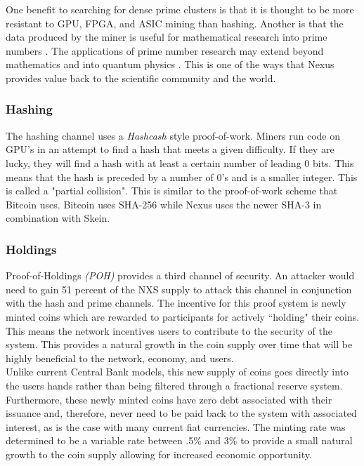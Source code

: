 \documentclass[11pt]{article}
\begin{document}
\noindent One benefit to searching for dense prime clusters is that it is thought to be more resistant to GPU, FPGA, and ASIC mining than hashing.
Another is that the data produced by the miner is useful for mathematical research into prime numbers \cite{findingprimeclusterspaper} \cite{nxsprimecom}.
The applications of prime number research may extend beyond mathematics and into quantum physics \cite{physicsmathprime}.
This is one of the ways that Nexus provides value back to the scientific community and the world.

\subsubsection{Hashing}

The hashing channel uses a \textit{Hashcash} \cite{hashcash} style proof-of-work.
Miners run code \cite{skminer,wolfniro} on GPU's in an attempt to find a hash that meets a given difficulty.
If they are lucky, they will find a hash with at least a certain number of leading 0 bits. 
This means that the hash is preceded by a number of 0's and is a smaller integer. 
This is called a "partial collision".
This is similar to the proof-of-work scheme that Bitcoin uses.
Bitcoin uses SHA-256 while Nexus uses the newer SHA-3 in combination with Skein.

\subsubsection{Holdings}

Proof-of-Holdings \textit{(POH)} provides a third channel of security.
An attacker would need to gain 51 percent of the NXS supply to attack this channel in conjunction with the hash and prime channels.
The incentive for this proof system is newly minted coins which are rewarded to participants for actively ``holding" their coins. 
This means the network incentives users to contribute to the security of the system. 
This provides a natural growth in the coin supply over time that will be highly beneficial to the network, economy, and users.\\ 

\noindent Unlike current Central Bank models, this new supply of coins goes directly into the users hands rather than being filtered through a fractional reserve system. 
Furthermore, these newly minted coins have zero debt associated with their issuance and, therefore, never need to be paid back to the system with associated interest, as is the case with many current fiat currencies.
The minting rate was determined to be a variable rate between .5\% and 3\% to provide a small natural growth to the coin supply allowing for increased economic opportunity.
\end{document}
